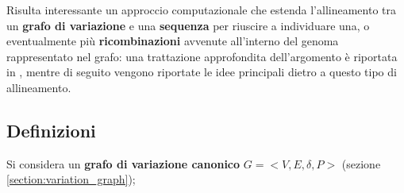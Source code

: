     \vspace{20pt}
    Risulta interessante un approccio computazionale che estenda l'allineamento tra un \textbf{grafo di variazione} e una \textbf{sequenza} per riuscire a individuare una, o eventualmente più \textbf{ricombinazioni} avvenute all'interno del genoma rappresentato nel grafo: una trattazione approfondita dell'argomento è riportata in \cite{Recgraph}, mentre di seguito vengono riportate le idee principali dietro a questo tipo di allineamento.

\subsection{Definizioni}
    Si considera un \textbf{grafo di variazione canonico} $G = <V, E, \delta, P>$ (sezione \ref{section:variation_graph});
    

